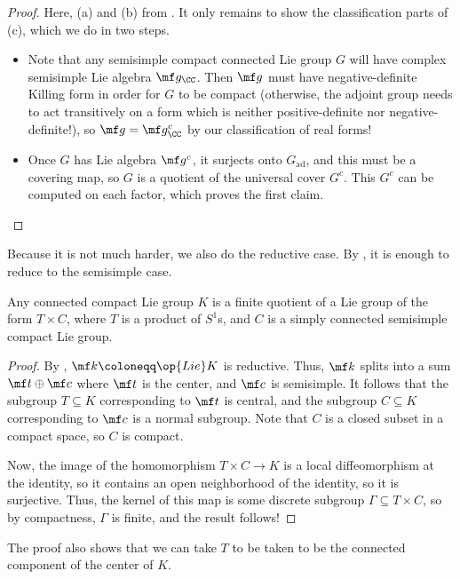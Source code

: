 \documentclass[../notes.tex]{subfiles}
\begin{document}
\begin{proof}
	Here, (a) and (b) from . It only remains to show the classification parts of (c), which we do in two steps.
	\begin{itemize}
		\item Note that any semisimple compact connected Lie group $G$ will have complex semisimple Lie algebra $\mf g_\CC$. Then $\mf g$ must have negative-definite Killing form in order for $G$ to be compact (otherwise, the adjoint group needs to act transitively on a form which is neither positive-definite nor negative-definite!), so $\mf g=\mf g_\CC^c$ by our classification of real forms!
		\item Once $G$ has Lie algebra $\mf g^c$, it surjects onto $G_{\mathrm{ad}}$, and this must be a covering map, so $G$ is a quotient of the universal cover $G^c$. This $G^c$ can be computed on each factor, which proves the first claim.
		\qedhere
	\end{itemize}
\end{proof}
Because it is not much harder, we also do the reductive case. By , it is enough to reduce to the semisimple case.
\begin{proposition} \label{prop:classify-compact}
	Any connected compact Lie group $K$ is a finite quotient of a Lie group of the form $T\times C$, where $T$ is a product of $S^1$s, and $C$ is a simply connected semisimple compact Lie group.
\end{proposition}
\begin{proof}
	By , $\mf k\coloneqq\op{Lie}K$ is reductive. Thus, $\mf k$ splits into a sum $\mf t\oplus\mf c$ where $\mf t$ is the center, and $\mf c$ is semisimple. It follows that the subgroup $T\subseteq K$ corresponding to $\mf t$ is central, and the subgroup $C\subseteq K$ corresponding to $\mf c$ is a normal subgroup. Note that $C$ is a closed subset in a compact space, so $C$ is compact.

	Now, the image of the homomorphism $T\times C\to K$ is a local diffeomorphism at the identity, so it contains an open neighborhood of the identity, so it is surjective. Thus, the kernel of this map is some discrete subgroup $\Gamma\subseteq T\times C$, so by compactness, $\Gamma$ is finite, and the result follows!
\end{proof}
\begin{remark}
	The proof also shows that we can take $T$ to be taken to be the connected component of the center of $K$.
\end{remark}
\end{document}
